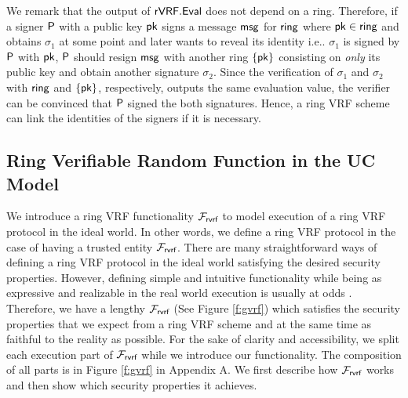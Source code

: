 We remark that the output of $ {\mathsf{rVRF}}.{\mathsf{Eval}} $ does not depend on a ring. Therefore, if a signer $ \mathsf{P} $ with a public key $ \mathsf{pk} $ signs a message $ \mathsf{msg} $ for $ \mathsf{ring} $ where $ \mathsf{pk} \in \mathsf{ring} $ and obtains $ \sigma_1 $ at some point  and later wants to reveal its identity i.e.. $ \sigma_1 $ is signed by $ \mathsf{P} $ with $ \mathsf{pk} $, $ \mathsf{P} $ should resign $ \mathsf{msg} $ with another ring $ \{\mathsf{pk}\} $ consisting on \emph{only} its public key and obtain another signature $ \sigma_2 $. Since the verification of $ \sigma_1 $ and $ \sigma_2 $ with $ \mathsf{ring} $ and $ \{\mathsf{pk}\} $, respectively, outputs the same evaluation value, the verifier can be convinced that $ \mathsf{P} $ signed the both signatures. Hence, a ring VRF scheme can link the identities of the signers if it is necessary.




\subsection{Ring Verifiable Random Function in the UC Model}
\label{subsec:uc_model}
We introduce a ring VRF functionality $ \mathcal{F}_{\textsf{rvrf}} $ to model execution of a ring VRF protocol in the ideal world. In other words, we define a ring VRF protocol in the case of having a trusted entity $ \mathcal{F}_{\textsf{rvrf}} $. There are many straightforward ways of defining a ring VRF protocol in the ideal world satisfying the desired security properties. However, defining simple and intuitive functionality while being as expressive and realizable in the real world execution is usually at odds \cite{canetti1}. Therefore, we have a lengthy $ \mathcal{F}_{\textsf{rvrf}} $ (See Figure \ref{f:gvrf}) which satisfies the security properties that we expect from a ring VRF scheme and at the same time as faithful to the reality as possible. For the sake of clarity and accessibility, we split each execution part of $ \mathcal{F}_{\textsf{rvrf}} $ while we introduce our functionality. The composition of all parts is in Figure \ref{f:gvrf} in Appendix A. We first describe how $  \mathcal{F}_{\textsf{rvrf}} $ works and then show which security properties it achieves.


